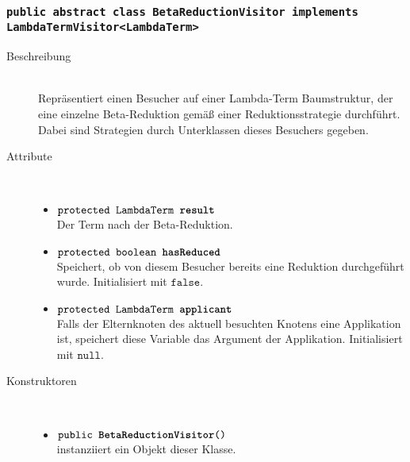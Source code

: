 \subsubsection{\normalfont \texttt{public abstract class \textbf{BetaReductionVisitor} implements LambdaTermVisitor<LambdaTerm>}}

\begin{description}
\item[Beschreibung] \hfill \\ Repräsentiert einen Besucher auf einer Lambda-Term Baumstruktur, der eine einzelne Beta-Reduktion gemäß einer Reduktionsstrategie durchführt. Dabei sind Strategien durch Unterklassen dieses Besuchers gegeben.

\item[Attribute] \hfill \\
	\vspace{-.8cm}
	\begin{itemize}
		\item $\texttt{protected LambdaTerm \textbf{result}}$ \\ Der Term nach der Beta-Reduktion.
		\item $\texttt{protected boolean \textbf{hasReduced}}$ \\ Speichert, ob von diesem Besucher bereits eine Reduktion durchgeführt wurde. Initialisiert mit $\texttt{false}$.
		\item $\texttt{protected LambdaTerm \textbf{applicant}}$ \\ Falls der Elternknoten des aktuell besuchten Knotens eine Applikation ist, speichert diese Variable das Argument der Applikation. Initialisiert mit $\texttt{null}$.
	\end{itemize}

\item[Konstruktoren] \hfill \\
	\vspace{-.8cm}
	\begin{itemize}
		\item $\texttt{public \textbf{BetaReductionVisitor}()}$ \\ instanziiert ein Objekt dieser Klasse.
	\end{itemize}


\end{description}
